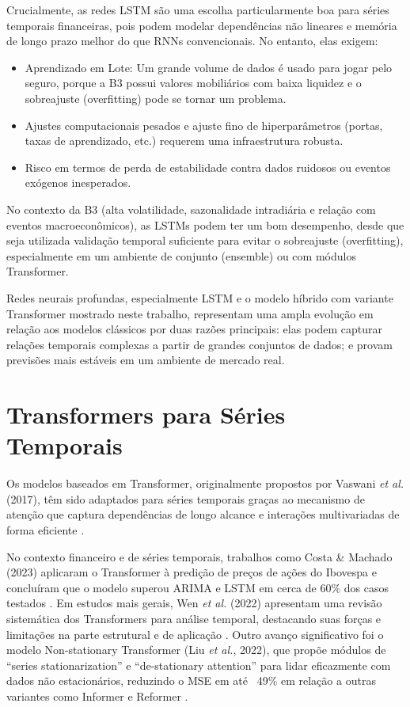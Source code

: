 Crucialmente, as redes LSTM são uma escolha particularmente boa para séries temporais financeiras, pois podem modelar dependências não lineares e memória de longo prazo melhor do que RNNs convencionais. No entanto, elas exigem:

\begin{itemize}
  \item Aprendizado em Lote: Um grande volume de dados é usado para jogar pelo seguro, porque a B3 possui valores mobiliários com baixa liquidez e o sobreajuste (overfitting) pode se tornar um problema.
  \item Ajustes computacionais pesados e ajuste fino de hiperparâmetros (portas, taxas de aprendizado, etc.) requerem uma infraestrutura robusta.
  \item Risco em termos de perda de estabilidade contra dados ruidosos ou eventos exógenos inesperados.
\end{itemize}

No contexto da B3 (alta volatilidade, sazonalidade intradiária e relação com eventos macroeconômicos), as LSTMs podem ter um bom desempenho, desde que seja utilizada validação temporal suficiente para evitar o sobreajuste (overfitting), especialmente em um ambiente de conjunto (ensemble) ou com módulos Transformer.

Redes neurais profundas, especialmente LSTM e o modelo híbrido com variante Transformer mostrado neste trabalho, representam uma ampla evolução em relação aos modelos clássicos por duas razões principais: elas podem capturar relações temporais complexas a partir de grandes conjuntos de dados; e provam previsões mais estáveis em um ambiente de mercado real.









\section{Transformers para Séries Temporais}

Os modelos baseados em Transformer, originalmente propostos por Vaswani \textit{et al.} (2017), têm sido adaptados para séries temporais graças ao mecanismo de atenção que captura dependências de longo alcance e interações multivariadas de forma eficiente \cite{wen2022survey}.

No contexto financeiro e de séries temporais, trabalhos como Costa \& Machado (2023) aplicaram o Transformer à predição de preços de ações do Ibovespa e concluíram que o modelo superou ARIMA e LSTM em cerca de 60\% dos casos testados \cite{costa2023ibovespa}. Em estudos mais gerais, Wen \textit{et al.} (2022) apresentam uma revisão sistemática dos Transformers para análise temporal, destacando suas forças e limitações na parte estrutural e de aplicação \cite{wen2022survey}. Outro avanço significativo foi o modelo Non-stationary Transformer (Liu \textit{et al.}, 2022), que propõe módulos de “series stationarization” e “de-stationary attention” para lidar eficazmente com dados não estacionários, reduzindo o MSE em até ~49\% em relação a outras variantes como Informer e Reformer \cite{liu2022nonstationary}.

